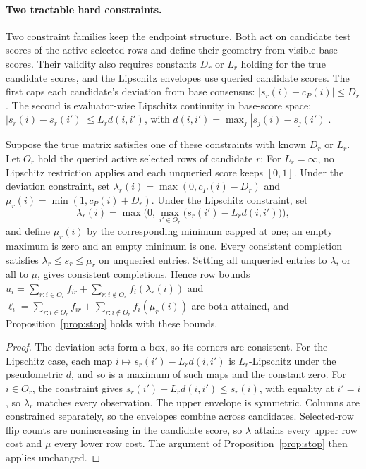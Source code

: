 \paragraph{Two tractable hard constraints.}
\label{app:constrained}
Two constraint families keep the endpoint structure. Both act on candidate test scores of the active selected rows and define their geometry from visible base scores. Their validity also requires constants $D_r$ or $L_r$ holding for the true candidate scores, and the Lipschitz envelopes use queried candidate scores. The first caps each candidate's deviation from base consensus: $|s_r(i)-c_P(i)|\le D_r$. The second is evaluator-wise Lipschitz continuity in base-score space: $|s_r(i)-s_r(i')|\le L_rd(i,i')$, with $d(i,i')=\max_j|s_j(i)-s_j(i')|$.
\begin{proposition}
\label{prop:constrained}
Suppose the true matrix satisfies one of these constraints with known $D_r$ or $L_r$. Let $O_r$ hold the queried active selected rows of candidate $r$; For $L_r=\infty$, no Lipschitz restriction applies and each unqueried score keeps $[0,1]$. Under the deviation constraint, set $\lambda_r(i)=\max(0,c_P(i)-D_r)$ and $\mu_r(i)=\min(1,c_P(i)+D_r)$. Under the Lipschitz constraint, set
\[
 \lambda_r(i)=\max\Big(0,\max_{i'\in O_r}\big(s_r(i')-L_rd(i,i')\big)\Big),
\]
and define $\mu_r(i)$ by the corresponding minimum capped at one; an empty maximum is zero and an empty minimum is one. Every consistent completion satisfies $\lambda_r\le s_r\le\mu_r$ on unqueried entries. Setting all unqueried entries to $\lambda$, or all to $\mu$, gives consistent completions. Hence row bounds $u_i=\sum_{r:i\in O_r}f_{ir}+\sum_{r:i\notin O_r}f_i(\lambda_r(i))$ and $\ell_i=\sum_{r:i\in O_r}f_{ir}+\sum_{r:i\notin O_r}f_i(\mu_r(i))$ are both attained, and Proposition~\ref{prop:stop} holds with these bounds.
\end{proposition}
\begin{proof}
The deviation sets form a box, so its corners are consistent. For the Lipschitz case, each map $i\mapsto s_r(i')-L_rd(i,i')$ is $L_r$-Lipschitz under the pseudometric $d$, and so is a maximum of such maps and the constant zero. For $i\in O_r$, the constraint gives $s_r(i')-L_rd(i,i')\le s_r(i)$, with equality at $i'=i$, so $\lambda_r$ matches every observation. The upper envelope is symmetric. Columns are constrained separately, so the envelopes combine across candidates. Selected-row flip counts are nonincreasing in the candidate score, so $\lambda$ attains every upper row cost and $\mu$ every lower row cost. The argument of Proposition~\ref{prop:stop} then applies unchanged.
\end{proof}
